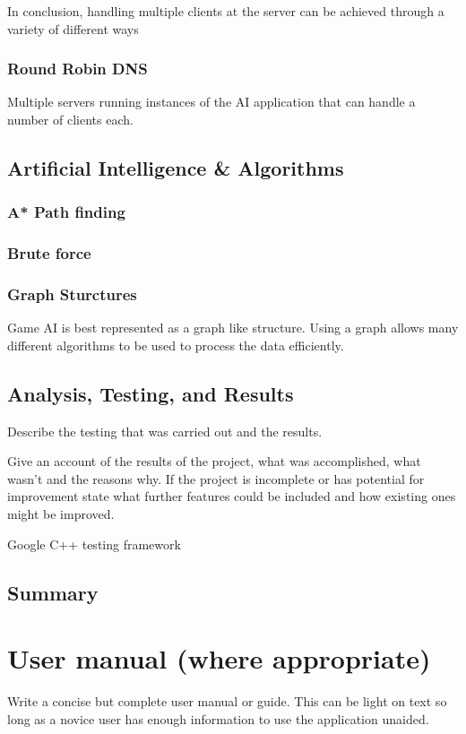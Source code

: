\documentclass[12pt,a4paper,titlepage]{article}
\begin{document}
In conclusion, handling multiple clients at the server can be achieved through a variety of different ways 

\subsubsection{Round Robin DNS}

Multiple servers running instances of the AI application that can handle a number of clients each. 

\subsection{Artificial Intelligence \& Algorithms}

\subsubsection{A* Path finding}

\subsubsection{Brute force}

\subsubsection{Graph Sturctures}

Game AI is best represented as a graph like structure. Using a graph allows many different algorithms to be used to process the data efficiently.

\subsection{Analysis, Testing, and Results}

Describe the testing that was carried out and the results.

Give an account of the results of the project, what was accomplished, what wasn't and the reasons why. If the project is incomplete or has potential for improvement state what further features could be included and how existing ones might be improved.

Google C++ testing framework

\subsection{Summary}


\section{User manual (where appropriate)}
Write a concise but complete user manual or guide. This can be light on text so long as a novice user has enough information to use the application unaided.
\end{document}
